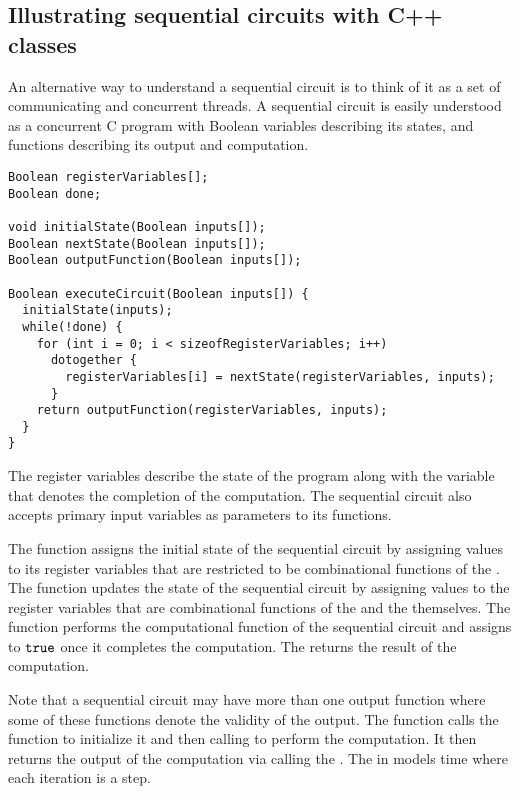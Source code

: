 \subsection{Illustrating sequential circuits with C++ 
    classes}
\label{sec:back:crct_cpp}

An alternative way to understand a sequential circuit is
to think of it as a set of communicating and concurrent
threads.  A sequential circuit is easily understood as a
concurrent C program with Boolean variables describing 
its states, and functions describing its output and
computation.

\begin{lstlisting}
Boolean registerVariables[];
Boolean done;
  
void initialState(Boolean inputs[]);
Boolean nextState(Boolean inputs[]);
Boolean outputFunction(Boolean inputs[]);

Boolean executeCircuit(Boolean inputs[]) {
  initialState(inputs);
  while(!done) {
    for (int i = 0; i < sizeofRegisterVariables; i++) 
      dotogether {
        registerVariables[i] = nextState(registerVariables, inputs); 
      }
    return outputFunction(registerVariables, inputs); 
  } 
} 
\end{lstlisting}

The register variables describe the state of the program along with the  
variable that denotes the completion of the computation.  
The sequential circuit also accepts primary input variables as parameters to its functions. 

The  function assigns the initial
state of the sequential circuit by assigning values to its
register variables that are restricted to be combinational
functions of the .  The 
function updates the state of the sequential circuit by
assigning values to the register variables that are
combinational functions of the  and the
 themselves.  The  
function performs the computational function of
the sequential circuit and assigns  to
$\mathtt{true}$ once it completes the computation.
The  returns the result of the
computation. 

Note that a sequential circuit may have more than one
output function where some of these functions denote the
validity of the output.  The function
 calls the 
function to initialize it and then calling
 to perform the computation.  It then
returns the output of the computation via calling the
.  The  in
 models time where each iteration
is a step. 
